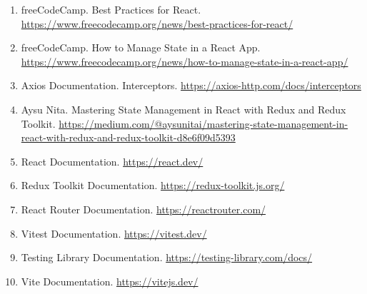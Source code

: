 \documentclass[10pt,a4paper,twocolumn]{article}
\begin{document}
\begin{enumerate}
  \item freeCodeCamp. Best Practices for React.
	  \url{https://www.freecodecamp.org/news/best-practices-for-react/}

  \item freeCodeCamp. How to Manage State in a React App.
	  \url{https://www.freecodecamp.org/news/how-to-manage-state-in-a-react-app/}

  \item Axios Documentation. Interceptors.
	  \url{https://axios-http.com/docs/interceptors}

  \item Aysu Nita. Mastering State Management in React with Redux and Redux Toolkit.
	  \url{https://medium.com/@aysunitai/mastering-state-management-in-react-with-redux-and-redux-toolkit-d8e6f09d5393}

  \item React Documentation.
	  \url{https://react.dev/}

  \item Redux Toolkit Documentation.
	  \url{https://redux-toolkit.js.org/}

  \item React Router Documentation.
	  \url{https://reactrouter.com/}

  \item Vitest Documentation.
	  \url{https://vitest.dev/}

  \item Testing Library Documentation.
	  \url{https://testing-library.com/docs/}

  \item Vite Documentation.
	  \url{https://vitejs.dev/}
\end{enumerate}
\end{document}
